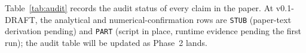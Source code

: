 Table~\ref{tab:audit} records the audit status of every claim in
the paper.  At v0.1-DRAFT, the analytical and numerical-confirmation
rows are \texttt{STUB} (paper-text derivation pending) and
\texttt{PART} (script in place, runtime evidence pending the first
run); the audit table will be updated as Phase~2 lands.


